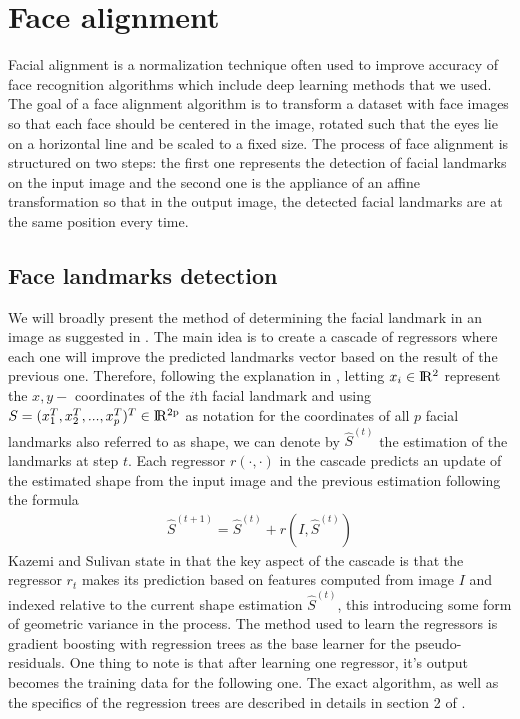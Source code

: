 \section{Face alignment}
Facial alignment is a normalization technique often used to improve accuracy of face recognition algorithms which include deep learning methods that we used. The goal of a face alignment algorithm is to transform a dataset with face images so that each face should be centered in the image, rotated such that the eyes lie on a horizontal line and be scaled to a fixed size.
The process of face alignment is structured on two steps: the first one represents the detection of facial landmarks on the input image and the second one is the appliance of an affine transformation so that in the output image, the detected facial landmarks are at the same position every time.
\subsection{Face landmarks detection}
We will broadly present the method of determining the facial landmark in an image as suggested in \cite{kazemi2014one}. The main idea is to create a cascade of regressors where each one will improve the predicted landmarks vector based on the result of the previous one. Therefore, following the explanation in \cite{kazemi2014one}, letting $x_{i} \in \rm I\!R^{2}$ represent the $x,y - $ coordinates of the $i$th facial landmark and using $S = (x_{1}^{T}, x_{2}^{T}, ..., x_{p}^{T})^{T} \in \rm I\!R^{2p}$ as notation for the coordinates of all $p$ facial landmarks also referred to as shape, we can denote by $\hat{S}^{(t)}$ the estimation of the landmarks at step $t$. Each regressor $r(\cdot, \cdot)$ in the cascade predicts an update of the estimated shape from the input image and the previous estimation following the formula 
\begin{align}
	\hat{S}^{(t+1)} = \hat{S}^{(t)} + r(I, \hat{S}^{(t)})
\end{align}
Kazemi and Sulivan state in \cite{kazemi2014one} that the key aspect of the cascade is that the regressor $r_{t}$ makes its prediction based on features computed from image $I$ and indexed relative to the current shape estimation $\hat{S}^{(t)}$, this introducing some form of geometric variance in the process. The method used to learn the regressors is gradient boosting with regression trees as the base learner for the pseudo-residuals. One thing to note is that after learning one regressor, it's output becomes the training data for the following one. The exact algorithm, as well as the specifics of the regression trees are described in details in section 2 of \cite{kazemi2014one}.

